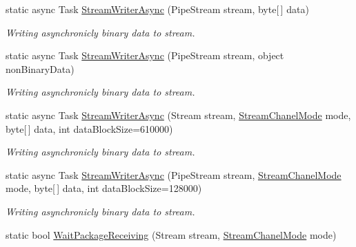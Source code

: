 \begin{DoxyCompactItemize}
\item 
static async Task \mbox{\hyperlink{class_uniform_data_operator_1_1_binary_1_1_i_o_1_1_stream_handler_a20c247a11a6523790a60e98f5f704fc7}{Stream\+Writer\+Async}} (Pipe\+Stream stream, byte\mbox{[}$\,$\mbox{]} data)
\begin{DoxyCompactList}\small\item\em Writing asynchronicly binary data to stream. \end{DoxyCompactList}\item 
static async Task \mbox{\hyperlink{class_uniform_data_operator_1_1_binary_1_1_i_o_1_1_stream_handler_a18b5d8b3ab9402ea3b112c7e7bd830be}{Stream\+Writer\+Async}} (Pipe\+Stream stream, object non\+Binary\+Data)
\begin{DoxyCompactList}\small\item\em Writing asynchronicly binary data to stream. \end{DoxyCompactList}\item 
static async Task \mbox{\hyperlink{class_uniform_data_operator_1_1_binary_1_1_i_o_1_1_stream_handler_a0fc1ed2097c0b9582d4abb366cee82b2}{Stream\+Writer\+Async}} (Stream stream, \mbox{\hyperlink{namespace_uniform_data_operator_1_1_binary_1_1_i_o_a3fee9a9bcba25974554ed63395942161}{Stream\+Chanel\+Mode}} mode, byte\mbox{[}$\,$\mbox{]} data, int data\+Block\+Size=610000)
\begin{DoxyCompactList}\small\item\em Writing asynchronicly binary data to stream. \end{DoxyCompactList}\item 
static async Task \mbox{\hyperlink{class_uniform_data_operator_1_1_binary_1_1_i_o_1_1_stream_handler_a60e2d04b9c5f656e5257ff52951207ce}{Stream\+Writer\+Async}} (Pipe\+Stream stream, \mbox{\hyperlink{namespace_uniform_data_operator_1_1_binary_1_1_i_o_a3fee9a9bcba25974554ed63395942161}{Stream\+Chanel\+Mode}} mode, byte\mbox{[}$\,$\mbox{]} data, int data\+Block\+Size=128000)
\begin{DoxyCompactList}\small\item\em Writing asynchronicly binary data to stream. \end{DoxyCompactList}\item 
static bool \mbox{\hyperlink{class_uniform_data_operator_1_1_binary_1_1_i_o_1_1_stream_handler_a8270ca6e114f289818bd1efabb5048b6}{Wait\+Package\+Receiving}} (Stream stream, \mbox{\hyperlink{namespace_uniform_data_operator_1_1_binary_1_1_i_o_a3fee9a9bcba25974554ed63395942161}{Stream\+Chanel\+Mode}} mode)

\end{DoxyCompactItemize}
